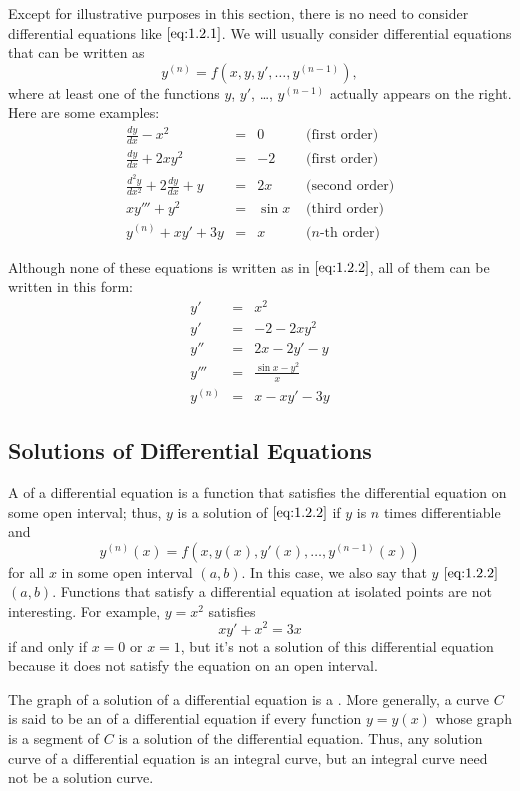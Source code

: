 \documentclass{ximera}
\begin{document}
Except for illustrative purposes in this section, there is no need to
consider differential equations like $\eqref{eq:1.2.1}$.  We will
usually consider differential equations that can be written as
\begin{equation} \label{eq:1.2.2}
y^{(n)}=f(x,y,y', \dots,y^{(n-1)}),
\end{equation}
where at least one of the functions $y$, $y'$, \dots, $y^{(n-1)}$ actually
appears on the right. Here are some examples:
$$
\begin{array}{rcll}
\frac{dy}{dx}-x^2&=&0&\text{ (first order)}  \\
\frac{dy}{dx}+2xy^2&=&-2&\text{ (first order)}   \\
\frac{d^2y}{dx^2}+2\frac{dy}{dx}+y&=&2x&\text{ (second order)}
\\
xy'''+y^2&=&\sin x  &\text{ (third order)}
\\
y^{(n)}+xy'+3y&=&x&\text{ (}n\text{-th order)}
\end{array}
$$

Although none of these equations is  written as in
$\eqref{eq:1.2.2}$, all of them can be written in this form:
$$
\begin{array}{rcl}
y'&=&x^2  \\
y'&=&-2-2xy^2   \\
y''&=&2x-2y'-y  \\
y'''&=&\frac{\sin x-y^2}{x}
\\ y^{(n)}&=&x-xy'-3y
\end{array}
$$
 
\subsection*{Solutions of Differential Equations}
 
A  of a differential equation is a function that
satisfies the differential equation on some open interval;   thus, $y$
is a solution of $\eqref{eq:1.2.2}$ if $y$ is $n$ times differentiable and
$$
y^{(n)}(x)=f(x,y(x),y'(x), \dots,y^{(n-1)}(x))
$$
for all $x$ in some open interval $(a,b)$. In this case, we also say
that $y$  $\eqref{eq:1.2.2}$  $(a,b)$. Functions
that satisfy a differential equation at isolated points are not
interesting. For example, $y=x^2$ satisfies
$$
xy'+x^2=3x
$$
if and only if $x=0$ or $x=1$, but it's not a solution of this
differential equation because it does not satisfy the equation on an
open interval.
 
The graph of a solution of a differential equation is  a . More generally, a curve $C$ is said to be an  of a differential equation if every function
$y=y(x)$ whose graph is a segment of $C$ is a solution of the
differential equation. Thus, any solution curve of a differential
equation is an integral curve, but an integral curve need not be a
solution curve.
 
\end{document}
